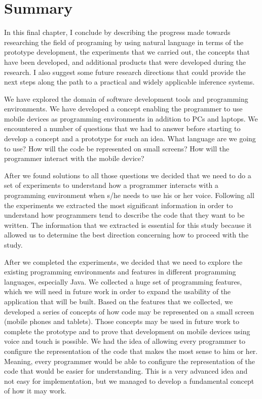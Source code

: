 \chapter{Summary}
In this final chapter, I conclude by describing the progress made towards researching the field of programing by using natural language in terms of the prototype development, the experiments that we carried out, the concepts that have been developed, and additional products that were developed during the research. I also suggest some future research directions that could provide the next steps along the path to a practical and widely applicable inference systems.

We have explored the domain of software development tools and programming environments. We have developed a concept enabling the programmer to use mobile devices as programming environments in addition to PCs and laptops. We encountered a number of questions that we had to answer before starting to develop a concept and a prototype for such an idea. What language are we going to use? How will the code be represented on small screens?  How will the programmer interact with the mobile device?

After we found solutions to all those questions we decided that we need to do a set of experiments to understand how a programmer interacts with a programming environment when s/he needs to use his or her voice. Following all the experiments we extracted the most significant information in order to understand how programmers tend to describe the code that they want to be written. The information that we extracted is essential for this study because it allowed us to determine the best direction concerning how to proceed with the study.

After we completed the experiments, we decided that we need to explore the existing programming environments and features in different programming languages, especially Java. We collected a huge set of programming features, which we will need in future work in order to expand the usability of the application that will be built.
Based on the features that we collected, we developed a series of concepts of how code may be represented on a small screen (mobile phones and tablets). Those concepts may be used in future work to complete the prototype and to prove that development on mobile devices using voice and touch is possible.
We had the idea of allowing every programmer to configure the representation of the code that makes the most sense to him or her. Meaning, every programmer would be able to configure the representation of the code that would be easier for understanding. This is a very advanced idea and not easy for implementation, but we managed to develop a fundamental concept of how it may work.

